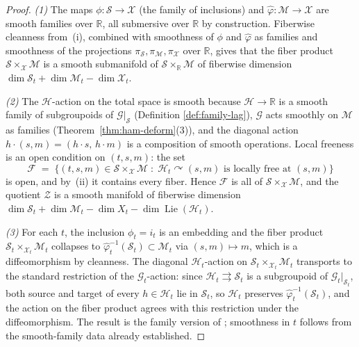 \documentclass[reqno]{amsart}
\theoremstyle{plain}
\theoremstyle{definition}
\newcommand{\R}{\mathbb{R}}
\newcommand{\G}{\mathcal{G}}
\renewcommand{\H}{\mathcal{H}}
\renewcommand{\S}{\mathcal{S}}
\newcommand{\M}{\mathcal{M}}
\newcommand{\X}{\mathcal{X}}
\newcommand{\Lie}{\operatorname{Lie}}
\begin{document}
\begin{proof}
\emph{(1)} The maps $\phi \colon \mathcal{S} \to \mathcal{X}$ (the family
of inclusions) and $\hat\varphi \colon \mathcal{M} \to \mathcal{X}$ are
smooth families over $\mathbb{R}$, all submersive over $\mathbb{R}$ by
construction. Fiberwise cleanness from~(i), combined with smoothness of
$\phi$ and $\hat\varphi$ as families and smoothness of the projections
$\pi_{\mathcal{S}}, \pi_{\mathcal{M}}, \pi_{\mathcal{X}}$ over $\mathbb{R}$,
gives that the fiber product
$\mathcal{S} \times_{\mathcal{X}} \mathcal{M}$ is a smooth submanifold of
$\mathcal{S} \times_{\mathbb{R}} \mathcal{M}$ of fiberwise dimension
$\dim \S_t + \dim \M_t - \dim \X_t$.
 
\emph{(2)} The $\H$-action on the total space is smooth because
$\H \to \R$ is a smooth family of subgroupoids of
$\G|_{\S}$ (Definition \ref{def:family-lag}),
$\G$ acts smoothly on $\M$ as families
(Theorem~\ref{thm:ham-deform}(3)), and the diagonal action
$h \cdot (s, m) = (h \cdot s,\, h \cdot m)$ is a composition of smooth operations. Local freeness is an open condition on $(t, s, m)$: the set
\[
   \mathcal{F}
   \;=\; \{(t, s, m) \in \mathcal{S} \times_{\mathcal{X}} \mathcal{M}
           \;:\; \H_t \curvearrowright (s, m)
           \text{ is locally free at } (s, m)\}
\]
is open, and by~(ii) it contains every fiber. Hence $\mathcal{F}$ is all
of $\mathcal{S} \times_{\mathcal{X}} \mathcal{M}$, and the quotient
$\mathcal{Z}$ is a smooth manifold of fiberwise dimension
$\dim \S_t + \dim \M_t - \dim X_t - \dim \Lie(\H_t)$.
 
\emph{(3)} For each $t$, the inclusion $\phi_t = i_t$ is an embedding and
the fiber product $\S_t \times_{\X_t} \M_t$ collapses to
$\hat\varphi_t^{-1}(\S_t) \subset \M_t$ via $(s, m) \mapsto m$, which is a
diffeomorphism by cleanness. The diagonal $\H_t$-action on
$\S_t \times_{\X_t} \M_t$ transports to the standard restriction of the
$\G_t$-action: since $\H_t \rightrightarrows \S_t$ is a subgroupoid
of $\G_t|_{\S_t}$, both source and target of every $h \in \H_t$
lie in $\S_t$, so $\H_t$ preserves $\hat\varphi_t^{-1}(\S_t)$, and the action on the fiber product agrees with this restriction under the diffeomorphism. The result is the family version of
\cite[Proposition 3.7]{bualibanu2026reduction}; smoothness in $t$ follows from the smooth-family data already established.
\end{proof}
\end{document}
